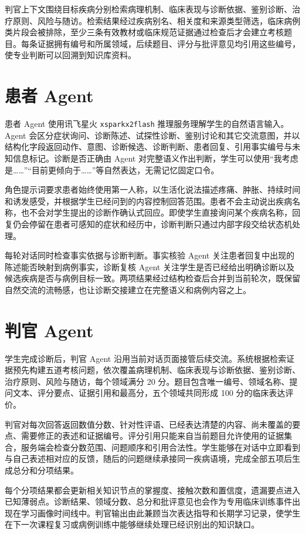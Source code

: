 判官上下文围绕目标疾病分别检索病理机制、临床表现与诊断依据、鉴别诊断、治疗原则、风险与随访。检索结果经过疾病别名、相关度和来源类型筛选，临床病例类片段会被排除，至少三条有效教材或临床规范证据通过检查后才会建立考核题目。每条证据拥有编号和所属领域，后续题目、评分与批评意见均引用这些编号，使专业判断可以回溯到知识库资料。

\section{患者 Agent}

患者 Agent 使用讯飞星火 \texttt{xsparkx2flash} 推理服务理解学生的自然语言输入。Agent 会区分症状询问、诊断陈述、试探性诊断、鉴别讨论和其它交流意图，并以结构化字段返回动作、意图、诊断候选、诊断判断、患者回复、引用事实编号与未知信息标记。诊断是否正确由 Agent 对完整语义作出判断，学生可以使用“我考虑是……”“目前更倾向于……”等自然表达，无需记忆固定口令。

角色提示词要求患者始终使用第一人称，以生活化说法描述疼痛、肿胀、持续时间和诱发感受，并根据学生已经问到的内容控制回答范围。患者不会主动说出疾病名称，也不会对学生提出的诊断作确认式回应。即使学生直接询问某个疾病名称，回复仍会停留在患者可感知的症状和经历中，诊断判断只通过内部字段交给状态机处理。

每轮对话同时检查事实依据与诊断判断。事实核验 Agent 关注患者回复中出现的陈述能否映射到病例事实，诊断复核 Agent 关注学生是否已经给出明确诊断以及候选疾病是否与病例目标一致。两项结果经过结构检查后合并到当前轮次，既保留自然交流的流畅感，也让诊断交接建立在完整语义和病例内容之上。

\section{判官 Agent}

学生完成诊断后，判官 Agent 沿用当前对话页面接管后续交流。系统根据检索证据预先构建五道考核问题，依次覆盖病理机制、临床表现与诊断依据、鉴别诊断、治疗原则、风险与随访，每个领域满分 20 分。题目包含唯一编号、领域名称、提问文本、评分要点、证据引用和最高分，五个领域共同形成 100 分的临床表达评价。

判官对每次回答返回数值分数、针对性评语、已经表达清楚的内容、尚未覆盖的要点、需要修正的表述和证据编号。评分引用只能来自当前题目允许使用的证据集合，服务端会检查分数范围、问题顺序和引用合法性。学生能够在对话中立即看到与自己表述相对应的反馈，随后的问题继续承接同一疾病语境，完成全部五项后生成总分和分项结果。

每个分项结果都会更新相关知识节点的掌握度、接触次数和置信度，遗漏要点进入已知薄弱点。诊断结果、领域分数、总分和批评意见也会作为专用临床训练事件出现在学习画像时间线中。判官输出由此兼顾当次表达指导和长期学习记录，使学生在下一次课程复习或病例训练中能够继续处理已经识别出的知识缺口。

